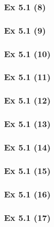 \subsubsection{Ex 5.1 (8)}\label{sec:Ex_5.1.8}

\subsubsection{Ex 5.1 (9)}\label{sec:Ex_5.1.9}

\subsubsection{Ex 5.1 (10)}\label{sec:Ex_5.1.10}

\newpage		%

\subsubsection{Ex 5.1 (11)}\label{sec:Ex_5.1.11}

\subsubsection{Ex 5.1 (12)}\label{sec:Ex_5.1.12}

\subsubsection{Ex 5.1 (13)}\label{sec:Ex_5.1.13}

\subsubsection{Ex 5.1 (14)}\label{sec:Ex_5.1.14}

\subsubsection{Ex 5.1 (15)}\label{sec:Ex_5.1.15}

\subsubsection{Ex 5.1 (16)}\label{sec:Ex_5.1.16}

\subsubsection{Ex 5.1 (17)}\label{sec:Ex_5.1.17}

